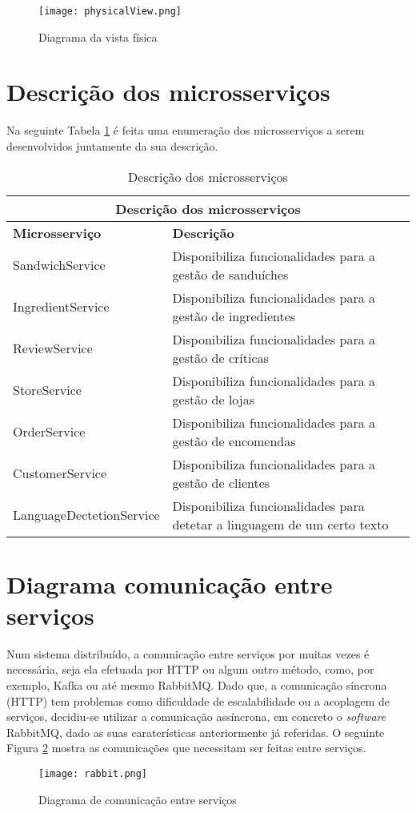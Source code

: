 \begin{figure}[H]
    \centering
    \texttt{[image: physicalView.png]}
    \caption{Diagrama da vista física}
    \label{fig:physicalView}
\end{figure}


\section{Descrição dos microsserviços}

Na seguinte Tabela \ref{table:descricaoMicrosserviços} é feita uma enumeração dos microsserviços a serem desenvolvidos juntamente da sua descrição.

\begin{table}[H]
\caption{Descrição dos microsserviços}
\label{table:descricaoMicrosserviços}
\begin{center}
\begin{tabular}{ |p{5cm}|p{10cm}|  }
\hline
\multicolumn{2}{|c|}{Descrição dos microsserviços} \\
\hline
\textbf{Microsserviço} & \textbf{Descrição} \\
\hline
SandwichService & Disponibiliza funcionalidades para a gestão de sanduíches\\
\hline
IngredientService &  Disponibiliza funcionalidades para a gestão de ingredientes\\
\hline
ReviewService &  Disponibiliza funcionalidades para a gestão de críticas\\
\hline
StoreService &  Disponibiliza funcionalidades para a gestão de lojas\\
\hline
OrderService &  Disponibiliza funcionalidades para a gestão de encomendas\\
\hline
CustomerService &  Disponibiliza funcionalidades para a gestão de clientes\\
\hline
LanguageDectetionService &  Disponibiliza funcionalidades para detetar a linguagem de um certo texto\\
\hline
\end{tabular} 
\end{center}
\end{table}

\section{Diagrama comunicação entre serviços}
Num sistema distribuído, a comunicação entre serviços por muitas vezes é necessária, seja ela efetuada por HTTP ou algum outro método, como, por exemplo, Kafka ou até mesmo RabbitMQ. Dado que, a comunicação síncrona (HTTP) tem problemas como dificuldade de escalabilidade ou a acoplagem de serviços, decidiu-se utilizar a comunicação assíncrona, em concreto o \textit{software} RabbitMQ, dado as suas caraterísticas anteriormente já referidas. O seguinte Figura \ref{fig:modulos} mostra as comunicações que necessitam ser feitas entre serviços.

\begin{figure}[H]
    \centering
    \texttt{[image: rabbit.png]}
    \caption{Diagrama de comunicação entre serviços}
    \label{fig:modulos}
\end{figure}